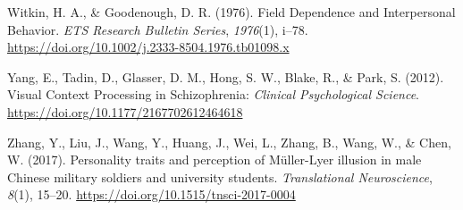 \documentclass[
  man,floatsintext]{apa6}
\newlength{\cslhangindent}
\newlength{\cslentryspacingunit} %
\newenvironment{CSLReferences}[2] %
 {%
  \setlength{\parindent}{0pt}
  \ifodd #1
  \let\oldpar\par
  \def\par{\hangindent=\cslhangindent\oldpar}
  \fi
  \setlength{\parskip}{#2\cslentryspacingunit}
 }%
 {}
\begin{document}
\begin{CSLReferences}{1}{0}
\leavevmode{}%
Witkin, H. A., \& Goodenough, D. R. (1976). Field Dependence and Interpersonal Behavior. \emph{ETS Research Bulletin Series}, \emph{1976}(1), i--78. \url{https://doi.org/10.1002/j.2333-8504.1976.tb01098.x}

\leavevmode{}%
Yang, E., Tadin, D., Glasser, D. M., Hong, S. W., Blake, R., \& Park, S. (2012). Visual Context Processing in Schizophrenia: \emph{Clinical Psychological Science}. \url{https://doi.org/10.1177/2167702612464618}

\leavevmode{}%
Zhang, Y., Liu, J., Wang, Y., Huang, J., Wei, L., Zhang, B., Wang, W., \& Chen, W. (2017). Personality traits and perception of Müller-Lyer illusion in male Chinese military soldiers and university students. \emph{Translational Neuroscience}, \emph{8}(1), 15--20. \url{https://doi.org/10.1515/tnsci-2017-0004}

\end{CSLReferences}


\clearpage
\renewcommand{\listfigurename}{Figure captions}
\end{document}
